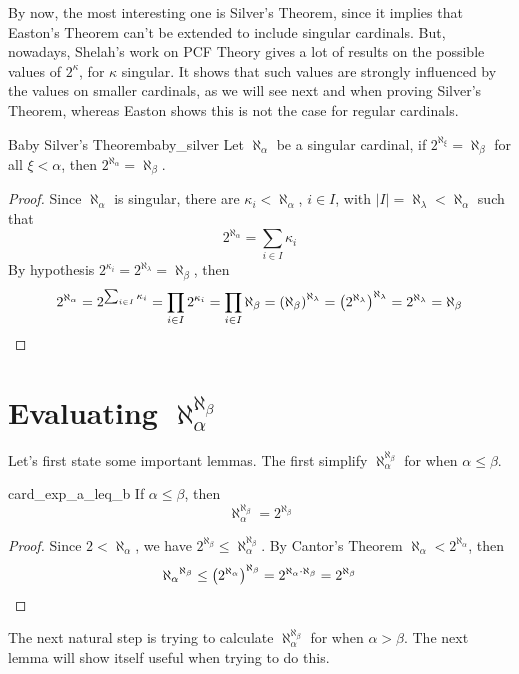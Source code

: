 By now, the most interesting one is Silver's Theorem, since it implies that Easton's Theorem can't be extended to include singular cardinals. But, nowadays, Shelah's work on PCF Theory gives a lot of results on the possible values of $2^\kappa$, for $\kappa$ singular. It shows that such values are strongly influenced by the values on smaller cardinals, as we will see next and when proving Silver's Theorem, whereas Easton shows this is not the case for regular cardinals.

\begin{lemma}{Baby Silver's Theorem}{baby_silver}
    Let $\aleph_\alpha$ be a singular cardinal, if $2^{\aleph_\xi}=\aleph_\beta$ for all $\xi<\alpha$, then $2^{\aleph_\alpha}=\aleph_\beta$.
\end{lemma}

\begin{proof}
    Since $\aleph_\alpha$ is singular, there are $\kappa_i<\aleph_\alpha$, $i\in I$, with $|I|=\aleph_\lambda<\aleph_\alpha$ such that
    $$2^{\aleph_\alpha}=\sum_{i\in I}\kappa_i$$
    By hypothesis $2^{\kappa_i}=2^{\aleph_\lambda}=\aleph_\beta$, then
    $$2^{\aleph_\alpha}=2^{\sum_{i\in I}\kappa_i}=\prod_{i\in I}2^{\kappa_i}=\prod_{i\in I}\aleph_\beta={\left(\aleph_\beta\right)}^{\aleph_\lambda}={\left(2^{\aleph_\lambda}\right)}^{\aleph_\lambda}=2^{\aleph_\lambda}=\aleph_\beta$$
\end{proof}

\section{Evaluating \texorpdfstring{$\aleph_\alpha^{\aleph_\beta}$}{alepha alephb}}

Let's first state some important lemmas. The first simplify $\aleph_\alpha^{\aleph_\beta}$ for when $\alpha\leq\beta$.

\begin{lemma}{}{card_exp_a_leq_b}
    If $\alpha\leq\beta$, then
    $$\aleph_\alpha^{\aleph_\beta}=2^{\aleph_\beta}$$
\end{lemma}

\begin{proof}
    Since $2<\aleph_\alpha$, we have $2^{\aleph_\beta}\leq\aleph_\alpha^{\aleph_\beta}$. By Cantor's Theorem $\aleph_\alpha<2^{\aleph_\alpha}$, then
    $${\aleph_\alpha}^{\aleph_\beta}\leq{\left(2^{\aleph_\alpha}\right)}^{\aleph_\beta}=2^{\aleph_\alpha\cdot\aleph_\beta}=2^{\aleph_\beta}$$
\end{proof}

The next natural step is trying to calculate $\aleph_\alpha^{\aleph_\beta}$ for when $\alpha>\beta$. The next lemma will show itself useful when trying to do this.

